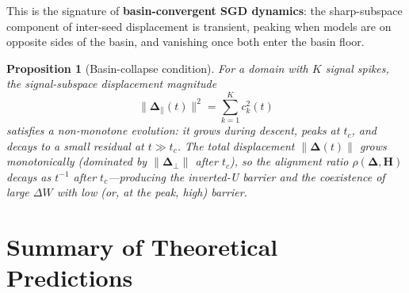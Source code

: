 \documentclass{article}
\newtheorem{proposition}{Proposition}
\newcommand{\Hess}{\mathbf{H}}
\newcommand{\bDelta}{\bm{\Delta}}
\begin{document}
This is the signature of \textbf{basin-convergent SGD dynamics}: the sharp-subspace
component of inter-seed displacement is transient, peaking when models are on opposite
sides of the basin, and vanishing once both enter the basin floor.

\begin{proposition}[Basin-collapse condition]\label{prop:collapse}
For a domain with $K$ signal spikes, the signal-subspace displacement magnitude
\begin{equation}
\|\bDelta_\parallel(t)\|^2 = \sum_{k=1}^K c_k^2(t)
\end{equation}
satisfies a \emph{non-monotone} evolution: it grows during descent, peaks at $t_c$, and decays
to a small residual at $t\gg t_c$. The total displacement $\|\bDelta(t)\|$ grows monotonically
(dominated by $\|\bDelta_\perp\|$ after $t_c$), so the alignment ratio
$\rho(\bDelta,\Hess)$ decays as $t^{-1}$ after $t_c$---producing the inverted-U barrier
and the coexistence of large $\Delta W$ with low (or, at the peak, high) barrier.
\end{proposition}

\section{Summary of Theoretical Predictions}
\end{document}
